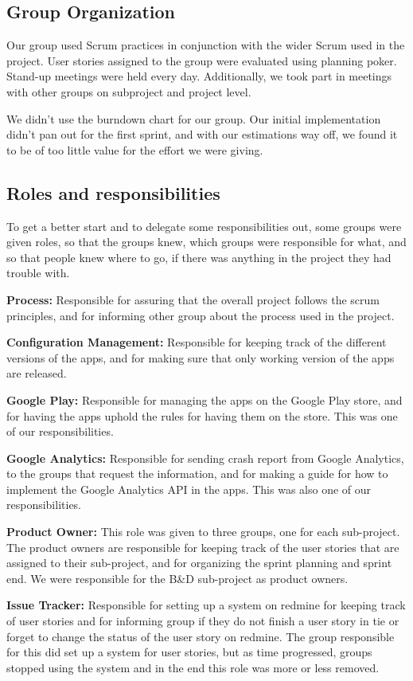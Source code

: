 \subsection{Group Organization}
Our group used Scrum practices in conjunction with the wider Scrum used in the project. User stories assigned to the group were evaluated using planning poker. Stand-up meetings were held every day. Additionally, we took part in meetings with other groups on subproject and project level.

We didn't use the burndown chart for our group. Our initial implementation didn't pan out for the first sprint, and with our estimations way off, we found it to be of too little value for the effort we were giving.

\subsection{Roles and responsibilities}
To get a better start and to delegate some responsibilities out, some groups were given roles, so that the groups knew, which groups were responsible for what, and so that people knew where to go, if there was anything in the project they had trouble with.


\textbf{Process:}
Responsible for assuring that the overall project follows the scrum principles, and for informing other group about the process used in the project.

\textbf{Configuration Management:}
Responsible for keeping track of the different versions of the apps, and for making sure that only working version of the apps are released.

\textbf{Google Play:}
Responsible for managing the apps on the Google Play store, and for having the apps uphold the rules for having them on the store. This was one of our responsibilities.

\textbf{Google Analytics:}
Responsible for sending crash report from Google Analytics, to the groups that request the information, and for making a guide for how to implement the Google Analytics API in the apps. This was also one of our responsibilities.

\textbf{Product Owner:}
This role was given to three groups, one for each sub-project. The product owners are responsible for keeping track of the user stories that are assigned to their sub-project, and for organizing the sprint planning and sprint end. We were responsible for the B\&D sub-project as product owners.

\textbf{Issue Tracker:}
Responsible for setting up a system on redmine for keeping track of user stories and for informing group if they do not finish a user story in tie or forget to change the status of the user story on redmine. The group responsible for this did set up a system for user stories, but as time progressed, groups stopped using the system and in the end this role was more or less removed.

